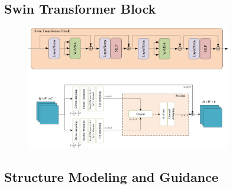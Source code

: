 \documentclass[CJK,aspectratio=169]{beamer}  %
\begin{document}
	
	\subsection{Swin Transformer Block}
	
	\begin{frame}
		
		\begin{figure}[htbp]
			\begin{center}
				\includegraphics[width=0.8\textwidth]{picture/LLIE/My Architecture/Swin Transformer}
			\end{center}
		\end{figure}
			
	\end{frame}
	
	\subsection{Structure Modeling and Guidance}
	
\end{document}
